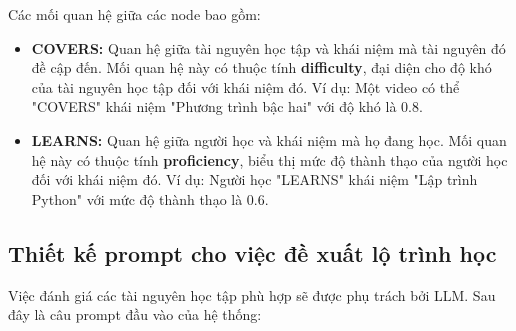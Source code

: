 Các mối quan hệ giữa các node bao gồm:
\begin{itemize}
    \item \textbf{COVERS:} Quan hệ giữa tài nguyên học tập và khái niệm mà tài nguyên đó đề cập đến. Mối quan hệ này có thuộc tính \textbf{difficulty}, đại diện cho độ khó của tài nguyên học tập đối với khái niệm đó. Ví dụ: Một video có thể "COVERS" khái niệm "Phương trình bậc hai" với độ khó là 0.8.
    \item \textbf{LEARNS:} Quan hệ giữa người học và khái niệm mà họ đang học. Mối quan hệ này có thuộc tính \textbf{proficiency}, biểu thị mức độ thành thạo của người học đối với khái niệm đó. Ví dụ: Người học "LEARNS" khái niệm "Lập trình Python" với mức độ thành thạo là 0.6.
\end{itemize}

\subsection{Thiết kế prompt cho việc đề xuất lộ trình học}
Việc đánh giá các tài nguyên học tập phù hợp sẽ được phụ trách bởi LLM. Sau đây là câu prompt đầu vào của hệ thống:
